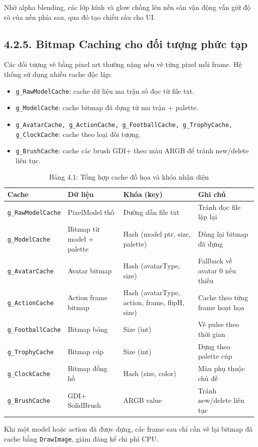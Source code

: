 \setlength{\parindent}{1.5em} Nhờ alpha blending, các lớp kính và glow chồng lên nền sân vận động vẫn giữ độ rõ của nền phía sau, qua đó tạo chiều sâu cho UI.

\subsection*{4.2.5. Bitmap Caching cho đối tượng phức tạp}

\setlength{\parindent}{1.5em} Các đối tượng vẽ bằng pixel art thường nặng nếu vẽ từng pixel mỗi frame. Hệ thống sử dụng nhiều cache độc lập:
\begin{itemize}
  \item \texttt{g\_RawModelCache}: cache dữ liệu ma trận số đọc từ file txt.
  \item \texttt{g\_ModelCache}: cache bitmap đã dựng từ ma trận + palette.
  \item \texttt{g\_AvatarCache, g\_ActionCache, g\_FootballCache, g\_TrophyCache, g\_ClockCache}: cache theo loại đối tượng.
  \item \texttt{g\_BrushCache}: cache các brush GDI+ theo màu ARGB để tránh new/delete liên tục.
\end{itemize}
\begin{table}[H]
\caption*{Bảng 4.1: Tổng hợp cache đồ họa và khóa nhận diện}
\label{tbl:ch4_cache_map}
\centering
\renewcommand{\arraystretch}{0.9}
\begin{tabularx}{\linewidth}{|L{4.0cm}|L{4.2cm}|L{4.4cm}|X|}
\hline
\textbf{Cache} & \textbf{Dữ liệu} & \textbf{Khóa (key)} & \textbf{Ghi chú} \\ \hline
\texttt{g\_RawModelCache} & PixelModel thô & Đường dẫn file txt & Tránh đọc file lặp lại \\ \hline
\texttt{g\_ModelCache} & Bitmap từ model + palette & Hash (model ptr, size, palette) & Dùng lại bitmap đã dựng \\ \hline
\texttt{g\_AvatarCache} & Avatar bitmap & Hash (avatarType, size) & Fallback về avatar 0 nếu thiếu \\ \hline
\texttt{g\_ActionCache} & Action frame bitmap & Hash (avatarType, action, frame, flipH, size) & Cache theo từng frame hoạt họa \\ \hline
\texttt{g\_FootballCache} & Bitmap bóng & Size (int) & Vẽ pulse theo thời gian \\ \hline
\texttt{g\_TrophyCache} & Bitmap cúp & Size (int) & Dựng theo palette cúp \\ \hline
\texttt{g\_ClockCache} & Bitmap đồng hồ & Hash (size, color) & Màu phụ thuộc chủ đề \\ \hline
\texttt{g\_BrushCache} & GDI+ SolidBrush & ARGB value & Tránh new/delete liên tục \\ \hline
\end{tabularx}
\end{table}
\setlength{\parindent}{1.5em} Khi một model hoặc action đã được dựng, các frame sau chỉ cần vẽ lại bitmap đã cache bằng \texttt{DrawImage}, giảm đáng kể chi phí CPU.

